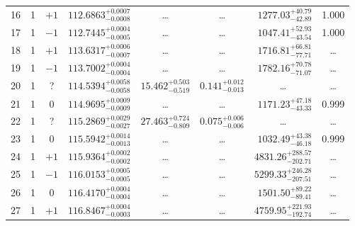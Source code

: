 \begin{table*}[!]
\begin{tabular}{llcrrlrc}
16 & 1 & $+1$ & $    112.6863_{-      0.0008}^{+      0.0007}$ & \multicolumn{1}{c}{\dots} & \multicolumn{1}{c}{\dots} & $     1277.03_{-       42.89}^{+       40.79}$ & 1.000\\[1pt]
17 & 1 & $-1$ & $    112.7445_{-      0.0005}^{+      0.0004}$ & \multicolumn{1}{c}{\dots} & \multicolumn{1}{c}{\dots} & $     1047.41_{-       43.54}^{+       52.93}$ & 1.000 \\[1pt]
18 & 1 & $+1$ & $    113.6317_{-      0.0007}^{+      0.0006}$ & \multicolumn{1}{c}{\dots} & \multicolumn{1}{c}{\dots} & $     1716.81_{-       77.71}^{+       66.81}$ & \dots \\[1pt]
19 & 1 & $-1$ & $    113.7002_{-      0.0004}^{+      0.0004}$ & \multicolumn{1}{c}{\dots} & \multicolumn{1}{c}{\dots} & $     1782.16_{-       71.07}^{+       70.78}$ & \dots \\[1pt]
20 & 1 & ? & $    114.5394_{-      0.0058}^{+      0.0058}$ & $      15.462_{-       0.519}^{+       0.503}$ & $       0.141_{-       0.013}^{+       0.012}$ & \multicolumn{1}{c}{\dots} & \dots \\[1pt]
21 & 1 & 0 & $    114.9695_{-      0.0009}^{+      0.0009}$ & \multicolumn{1}{c}{\dots} & \multicolumn{1}{c}{\dots} & $     1171.23_{-       43.33}^{+       47.18}$ & 0.999 \\[1pt]
22 & 1 & ? & $    115.2869_{-      0.0027}^{+      0.0029}$ & $      27.463_{-       0.809}^{+       0.724}$ & $       0.075_{-       0.006}^{+       0.006}$ & \multicolumn{1}{c}{\dots} & \dots \\[1pt]
23 & 1 & 0 & $    115.5942_{-      0.0013}^{+      0.0014}$ & \multicolumn{1}{c}{\dots} & \multicolumn{1}{c}{\dots} & $     1032.49_{-       46.18}^{+       43.38}$ & 0.999\\[1pt]
24 & 1 & $+1$ & $    115.9364_{-      0.0002}^{+      0.0002}$ & \multicolumn{1}{c}{\dots} & \multicolumn{1}{c}{\dots} & $     4831.26_{-      202.71}^{+      288.57}$ & \dots \\[1pt]
25 & 1 & $-1$ & $    116.0153_{-      0.0005}^{+      0.0005}$ & \multicolumn{1}{c}{\dots} & \multicolumn{1}{c}{\dots} & $     5299.33_{-      207.51}^{+      246.28}$ & \dots \\[1pt]
26 & 1 & 0 & $    116.4170_{-      0.0004}^{+      0.0004}$ & \multicolumn{1}{c}{\dots} & \multicolumn{1}{c}{\dots} & $     1501.50_{-       89.41}^{+       89.22}$ & \dots \\[1pt]
27 & 1 & $+1$ & $    116.8467_{-      0.0003}^{+      0.0004}$ & \multicolumn{1}{c}{\dots} & \multicolumn{1}{c}{\dots} & $     4759.95_{-      192.74}^{+      221.93}$ & \dots \\[1pt]

\end{tabular}
\end{table*}
